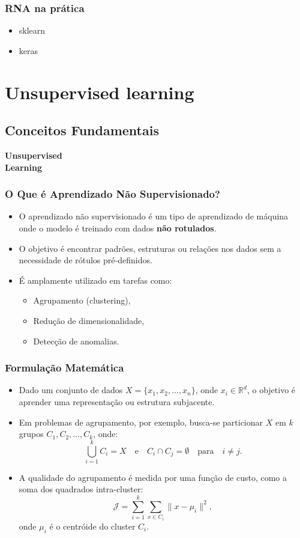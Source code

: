 \documentclass{beamer}
\begin{document}
\begin{frame}
\frametitle{RNA na prática}
\begin{itemize}
    \item sklearn
    \item keras
\end{itemize}
\end{frame}

\section{Unsupervised learning}
\subsection{Conceitos Fundamentais}
\begin{frame}
\centering
\Huge
\textbf{Unsupervised\\ Learning}
\end{frame}

\begin{frame}
\frametitle{O Que é Aprendizado Não Supervisionado?}
\begin{itemize}
    \item O aprendizado não supervisionado é um tipo de aprendizado de máquina onde o modelo é treinado com dados \textbf{não rotulados}.
    \item O objetivo é encontrar padrões, estruturas ou relações nos dados sem a necessidade de rótulos pré-definidos.
    \item É amplamente utilizado em tarefas como:
    \begin{itemize}
        \item Agrupamento (clustering),
        \item Redução de dimensionalidade,
        \item Detecção de anomalias.
    \end{itemize}
\end{itemize}
\end{frame}

\begin{frame}
\frametitle{Formulação Matemática}
\begin{itemize}
    \item Dado um conjunto de dados \( X = \{x_1, x_2, \dots, x_n\} \), onde \( x_i \in \mathbb{R}^d \), o objetivo é aprender uma representação ou estrutura subjacente.
    \item Em problemas de agrupamento, por exemplo, busca-se particionar \( X \) em \( k \) grupos \( C_1, C_2, \dots, C_k \), onde:
    \[
    \bigcup_{i=1}^k C_i = X \quad \text{e} \quad C_i \cap C_j = \emptyset \quad \text{para} \quad i \neq j.
    \]
    \item A qualidade do agrupamento é medida por uma função de custo, como a soma dos quadrados intra-cluster:
    \[
    \mathcal{J} = \sum_{i=1}^k \sum_{x \in C_i} \|x - \mu_i\|^2,
    \]
    onde \( \mu_i \) é o centróide do cluster \( C_i \).
\end{itemize}
\end{frame}
\end{document}
